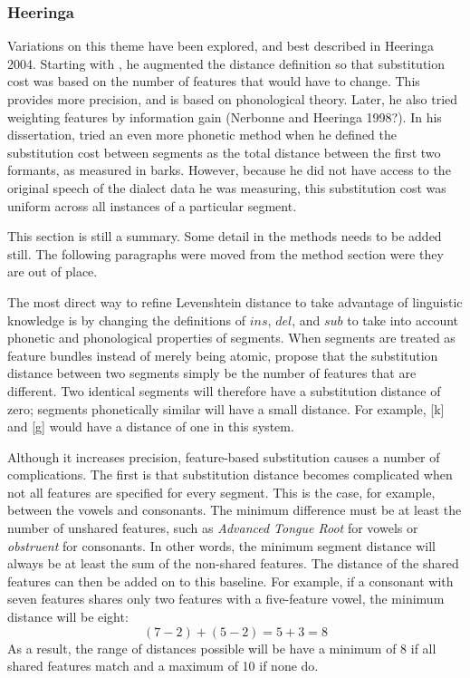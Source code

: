 \documentclass[11pt]{article}
\begin{document}
\subsubsection{Heeringa}

Variations on this theme have been explored, and best
described in Heeringa 2004. Starting with \cite{nerbonne97}, he
augmented the distance definition so that substitution cost was based
on the number of features that would have to change. This provides
more precision, and is based on phonological theory. Later, he also
tried weighting features by information gain (Nerbonne and Heeringa
1998?). In his dissertation,  tried an even more
phonetic method when he defined the substitution cost between segments
as the total distance between the first two formants, as measured in
barks. However, because he did not have access to the original speech
of the dialect data he was measuring, this substitution cost was
uniform across all instances of a particular segment.

This section is still a summary. Some detail in the methods needs to
be added still. The following paragraphs were moved from the method
section were they are out of place.

The most direct way to refine Levenshtein distance to take advantage
of linguistic knowledge is by
changing the definitions of $ins$, $del$, and $sub$ to take into
account phonetic
and phonological properties of segments. When segments are treated as
feature bundles instead of merely being atomic, \cite{nerbonne97}
propose that the substitution distance between two segments simply be
the number of features that are different. Two identical segments will
therefore have a substitution distance of zero; segments phonetically
similar will have a small distance. For example, [k] and [g] would
have a distance of one in this system.

Although it increases precision, feature-based substitution causes a
number of complications. The first is that substitution distance
becomes complicated when not all features are specified for every segment. This is
the case, for example, between the vowels and consonants.
The minimum difference must be at least the number of unshared
features, such as \emph{Advanced Tongue Root} for vowels or
\emph{obstruent} for consonants. In other words, the minimum segment
distance will always be at least the sum of the non-shared
features. The distance of the shared features can then be added on to
this baseline. %
For example, if a consonant with seven features shares only two
features with a five-feature vowel, the minimum distance will be eight:
\[ (7 - 2) + (5 - 2) = 5 + 3 = 8 \] As a result, the range of
distances possible will be have a minimum of 8 if all shared features
match and a maximum of 10 if none do.
\end{document}

